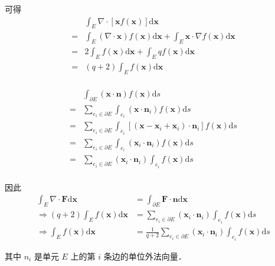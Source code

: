 可得 \\
\begin{equation*}
\begin{aligned}
& \int_E\nabla\cdot[\mathbf x f(\mathbf x)]\mathrm d \mathbf x \\
=& \int_E (\nabla\cdot\mathbf x)f(\mathbf x)\mathrm d \mathbf x + 
\int_E \mathbf x\cdot \nabla f(\mathbf x)\mathrm d \mathbf x\\
=& 2 \int_E f(\mathbf x)\mathrm d \mathbf x + 
\int_E qf(\mathbf x)\mathrm d \mathbf x\\
=& (q+2) \int_E f(\mathbf x)\mathrm d \mathbf x \\
\end{aligned}
\end{equation*}

\begin{equation*}
\begin{aligned}
& \int_{\partial E} (\mathbf x\cdot \mathbf n)  f(\mathbf x)\mathrm ds\\
=& \sum_{e_i\in\partial E}\int_{e_i} (\mathbf x\cdot \mathbf n_i)  f(\mathbf x)\mathrm ds\\
=& \sum_{e_i\in\partial E}\int_{e_i} [(\mathbf x - \mathbf x_i + \mathbf x_i)\cdot \mathbf n_i] f(\mathbf x)\mathrm ds\\
=& \sum_{e_i\in\partial E}\int_{e_i} (\mathbf x_i\cdot \mathbf n_i)  f(\mathbf x)\mathrm ds\\
=& \sum_{e_i\in\partial E}(\mathbf x_i\cdot \mathbf n_i)\int_{e_i} f(\mathbf x)\mathrm ds\\
\end{aligned}
\end{equation*}

因此 \\
\begin{equation*}
\begin{aligned}
\int_{E}\nabla\cdot\mathbf{F}\mathrm{d}\mathbf{x} & = \int_{\partial E}\mathbf{F}\cdot\mathbf{n}\mathrm{d}\mathbf{x} \\
\Rightarrow
(q+2) \int_E f(\mathbf x)\mathrm d \mathbf x & = \sum_{e_i\in\partial E}(\mathbf x_i\cdot \mathbf n_i)\int_{e_i} f(\mathbf x)\mathrm ds \\
\Rightarrow
\int_E f(\mathbf x)\mathrm d \mathbf x & = \frac{1}{q + 2}\sum_{e_i\in\partial E}(\mathbf x_i\cdot \mathbf n_i)\int_{e_i} f(\mathbf x)\mathrm ds
\end{aligned}
\end{equation*}

其中 $n_i$ 是单元 $E$ 上的第 $i$ 条边的单位外法向量．\\

